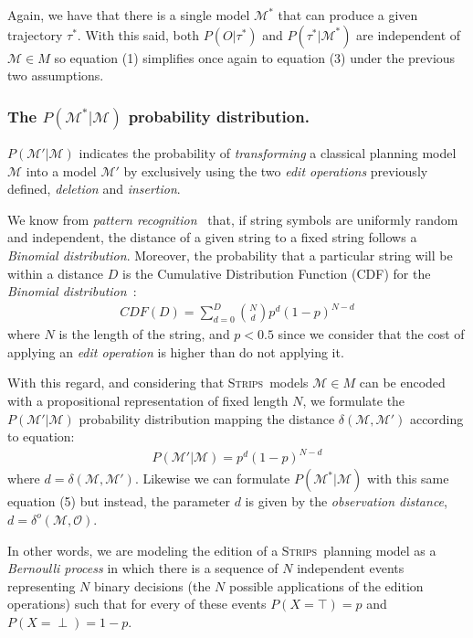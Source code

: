 \documentclass[letterpaper]{article} %
\newcommand{\strips}{\textsc{Strips}}     %
\begin{document}
Again, we have that there is a single model $\mathcal{M}^*$ that can produce a given trajectory $\tau^*$. With this said, both $P(O|\tau^*)$ and $P(\tau^*|\mathcal{M}^*)$ are independent of $\mathcal{M} \in M$ so equation (1) simplifies once again to equation (3) under the previous two assumptions.

\subsubsection{The $P(\mathcal{M^*}|\mathcal{M})$ probability distribution.} $P(\mathcal{M'}|\mathcal{M})$ indicates the probability of {\em transforming} a classical planning model $\mathcal{M}$ into a model $\mathcal{M'}$ by exclusively using the two {\em edit operations} previously defined, {\em deletion} and {\em insertion}.

We know from {\em pattern recognition}~\cite{devroye2013probabilistic} that, if string symbols are uniformly random and independent, the distance of a given string to a fixed string follows a {\em Binomial distribution}. Moreover, the probability that a particular string will be within a distance $D$ is the Cumulative Distribution Function (CDF) for the {\em Binomial distribution}~\cite{wilcox1981review}:
\begin{align}
CDF(D)=\sum_{d=0}^D{{N}\choose{d}}  p^d (1-p)^{N-d}
\end{align}
where $N$ is the length of the string, and $p<0.5$ since we consider that the cost of applying an {\em edit operation} is higher than do not applying it.

With this regard, and considering that \strips\ models $\mathcal{M}\in M$ can be encoded with a propositional representation of fixed length $N$, we formulate the $P(\mathcal{M'}|\mathcal{M})$ probability distribution mapping the distance $\delta(\mathcal{M},\mathcal{M'})$ according to equation:
\begin{align}
P(\mathcal{M'}|\mathcal{M}) = p^d  (1-p)^{N-d}
\end{align}
where $d=\delta(\mathcal{M},\mathcal{M}')$. Likewise we can formulate $P(\mathcal{M^*}|\mathcal{M})$ with this same equation (5) but instead, the parameter $d$ is given by the {\em observation distance}, $d=\delta^o(\mathcal{M},\mathcal{O})$.

In other words, we are modeling the edition of a \strips\ planning model as a {\em Bernoulli process} in which there is a sequence of $N$ independent events representing $N$ binary decisions (the $N$ possible applications of the edition operations) such that for every of these events $P(X=\top)=p$ and $P(X=\perp)=1-p$.
\end{document}
